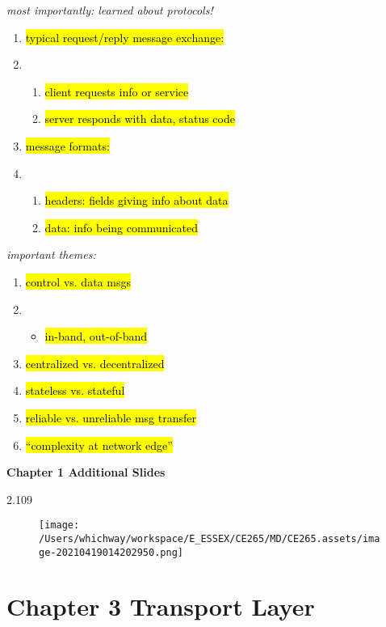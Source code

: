 \documentclass[
]{article}
\begin{document}
\emph{most importantly: learned about protocols!}

\begin{enumerate}
\def\labelenumi{\arabic{enumi}.}
\item
  \hl{typical request/reply message exchange:}
\item
  \begin{enumerate}
  \def\labelenumii{\arabic{enumii}.}
  \item
    \hl{client requests info or service}
  \item
    \hl{server responds with data, status code}
  \end{enumerate}
\item
  \hl{message formats:}
\item
  \begin{enumerate}
  \def\labelenumii{\arabic{enumii}.}
  \item
    \hl{headers: fields giving info about data}
  \item
    \hl{data: info being communicated}
  \end{enumerate}
\end{enumerate}

\emph{important themes:}

\begin{enumerate}
\def\labelenumi{\arabic{enumi}.}
\item
  \hl{control vs. data msgs}
\item
  \begin{itemize}
  \item
    \hl{in-band, out-of-band}
  \end{itemize}
\item
  \hl{centralized vs. decentralized}
\item
  \hl{stateless vs. stateful}
\item
  \hl{reliable vs. unreliable msg transfer}
\item
  \hl{``complexity at network edge''}
\end{enumerate}

\textbf{Chapter 1 Additional Slides}

2.109

\begin{figure}
\centering
\texttt{[image: /Users/whichway/workspace/E\_ESSEX/CE265/MD/CE265.assets/image-20210419014202950.png]}
\caption{}
\end{figure}

\hypertarget{chapter-3-transport-layer}{%
\section{Chapter 3 Transport Layer}\label{chapter-3-transport-layer}}
\end{document}
